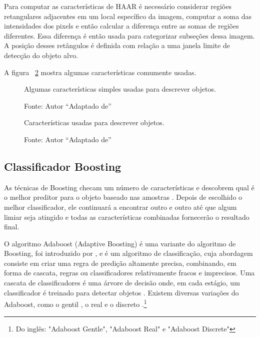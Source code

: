 Para computar as características de HAAR é necessário considerar regiões retangulares adjacentes em um local específico da imagem, computar a soma das intensidades dos pixels e então calcular a diferença entre as somas de regiões diferentes. Essa diferença é então usada para categorizar subseções dessa imagem. A posição desses retângulos é definida com relação a uma janela limite de detecção do objeto alvo.  

A figura ~\ref{fig_features} mostra algumas características comumente usadas. 

\begin{figure}[!h!]%
    \centering \caption{Algumas características simples usadas para descrever objetos.}%
    \qquad
    \qquad
    \qquad

    \caption*{Fonte: Autor ``Adaptado de'' }
    \label{fig_features}%
\end{figure}

\begin{figure}[!h!]%
    \centering \caption{Características usadas para descrever objetos.}%
    \qquad

    \caption*{Fonte: Autor ``Adaptado de'' }
    \label{fig_features}%
\end{figure}

	\subsection{Classificador Boosting}

As técnicas de Boosting checam um número de características e descobrem qual é o melhor preditor para o objeto baseado nas amostras \cite{Avidan}. Depois de escolhido o melhor classificador, ele continuará a encontrar outro e outro até que algum limiar seja atingido e todas as características combinadas fornecerão o resultado final. 

O algoritmo Adaboost (Adaptive Boosting) é uma variante do algoritmo de Boosting, foi introduzido por \cite{Adaboost}, e é um algoritmo de classificação, cuja abordagem consiste em criar uma regra de predição altamente precisa, combinando, em forma de cascata, regras ou classificadores relativamente fracos e imprecisos. Uma cascata de classificadores é uma árvore de decisão onde, em cada estágio, um classificador é treinado para detectar objetos \cite{Viola}. Existem diversas variações do Adaboost, como o gentil \cite{SchapireGentle1} \cite{SchapireGentle2}, o real\cite{FriedmanReal} e o discreto \cite{Adaboost}.\footnote{Do inglês: "Adaboost Gentle", "Adaboost Real" e "Adaboost Discrete"}

